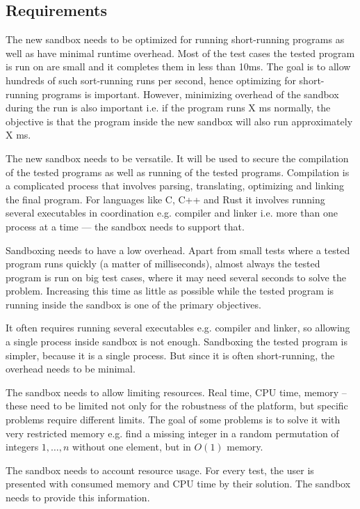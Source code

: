 \documentclass[en]{pracamgr}
\begin{document}
\subsection{Requirements}

The new sandbox needs to be optimized for running short-running programs as well as have minimal runtime overhead. Most of the test cases the tested program is run on are small and it completes them in less than 10ms. The goal is to allow hundreds of such sort-running runs per second, hence optimizing for short-running programs is important. However, minimizing overhead of the sandbox during the run is also important i.e. if the program runs X ms normally, the objective is that the program inside the new sandbox will also run approximately X ms.

The new sandbox needs to be versatile. It will be used to secure the compilation of the tested programs as well as running of the tested programs. Compilation is a complicated process that involves parsing, translating, optimizing and linking the final program. For languages like C, C++ and Rust it involves running several executables in coordination e.g. compiler and linker i.e. more than one process at a time --- the sandbox needs to support that.

Sandboxing needs to have a low overhead. Apart from small tests where a tested program runs quickly (a matter of milliseconds), almost always the tested program is run on big test cases, where it may need several seconds to solve the problem. Increasing this time as little as possible while the tested program is running inside the sandbox is one of the primary objectives.

It often requires running several executables e.g. compiler and linker, so allowing a single process inside sandbox is not enough. Sandboxing the tested program is simpler, because it is a single process. But since it is often short-running, the overhead needs to be minimal.

The sandbox needs to allow limiting resources. Real time, CPU time, memory -- these need to be limited not only for the robustness of the platform, but specific problems require different limits. The goal of some problems is to solve it with very restricted memory e.g. find a missing integer in a random permutation of integers $1, \ldots, n$ without one element, but in $O(1)$ memory.

The sandbox needs to account resource usage. For every test, the user is presented with consumed memory and CPU time by their solution. The sandbox needs to provide this information.
\end{document}
